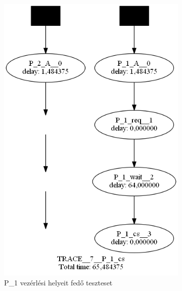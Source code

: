 \begin{figure}
     \centering
     \begin{subfigure}[b]{0.4\textwidth}
         \centering
         \includegraphics[width=\textwidth]{src/figures/fischer-test1.png}
         \caption{P\_1 vezérlési helyeit fedő teszteset}
         \label{fig:fischer-test1}
     \end{subfigure}
     \hfill
     \begin{subfigure}[b]{0.4\textwidth}
         \centering

\end{subfigure}
\end{figure}
